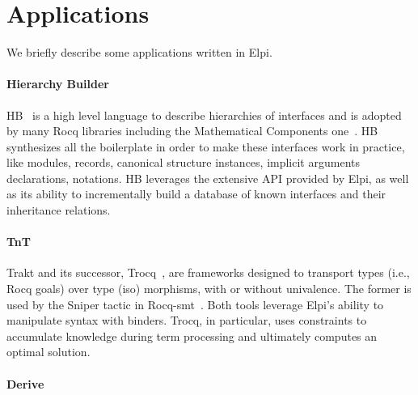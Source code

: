 \documentclass[sigplan,natbib=false]{acmart}
\begin{document}
\section{Applications}

We briefly describe some applications written in Elpi.

\paragraph{Hierarchy Builder}
HB~\cite{cohen_et_al:LIPIcs.FSCD.2020.34} is a high level language to describe hierarchies
of interfaces and is adopted by many Rocq libraries including the Mathematical
Components one~\cite{affeldt:hal-03463762}. HB synthesizes all the boilerplate in order to
make these interfaces work in practice, like modules, records, canonical
structure instances, implicit arguments declarations, notations. 
HB leverages the extensive API provided by Elpi, as well as its ability to incrementally
build a database of known interfaces and their inheritance relations.

\paragraph{TnT}

Trakt and its successor, Trocq~\cite{10.1007/978-3-031-57262-3_10}, are
frameworks designed to transport types (i.e., Rocq goals) over type
(iso) morphisms, with or without univalence. The former is used by the Sniper
tactic in Rocq-smt~\cite{DBLP:conf/cpp/Blot0CPKMV23}. Both tools leverage
Elpi's ability to manipulate syntax with binders. Trocq, in particular, uses
constraints to accumulate knowledge during term processing and ultimately
computes an optimal solution.

\paragraph{Derive}
\end{document}
